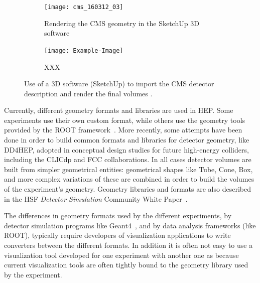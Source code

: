 \documentclass[12pt,a4paper]{article}
\begin{document}
\begin{figure}
	\centering
	\begin{subfigure}[b]{0.475\textwidth}
		\centering
		\texttt{[image: cms\_160312\_03]}
		\caption[CMS use of the SketchUp 3D software]%
		{{\small Rendering the CMS geometry in the SketchUp 3D software}}    
		\label{fig:cms-sketchup-a}
	\end{subfigure}
	\quad
	\begin{subfigure}[b]{0.475\textwidth}  
		\centering 
		\texttt{[image: Example-Image]}
		\caption[XXX]{{\small XXX}}    
		\label{fig:ed-sketchup-b}
	\end{subfigure}
	\caption[Using 3D editing software for HEP Geometry]
	{\small Use of a 3D software (SketchUp) to import the CMS detector description and render the final volumes \cite{CMSSketchUpImages}.} 
	\label{fig:cms-sketchup}
\end{figure}


Currently, different geometry formats and libraries are used in HEP.
Some experiments use their own custom format, while others use the geometry tools provided by the ROOT framework~\cite{Root1997}. More recently, some attempts have been
done in order to build common formats and libraries for detector geometry, like DD4HEP,  adopted in conceptual design studies
for future high-energy colliders, including the CLICdp and FCC collaborations. In all cases detector
volumes are built from simpler geometrical entities: geometrical shapes like Tube, Cone, Box, and more complex variations of these
are combined in order to build the volumes of the experiment’s geometry. Geometry libraries and formats are also described in the HSF \textit{Detector Simulation} Community White Paper~\cite{HSF-CWP-2017-07}.

The differences in geometry formats used by the different experiments, by detector simulation programs like Geant4~\cite{Geant4},
and by data analysis frameworks (like ROOT), typically require developers of visualization applications to write converters
between the different formats. In addition it is often not easy to use a visualization tool developed for one experiment with another one as
because current visualization tools are often tightly bound to the geometry library used by the experiment.

\end{document}
